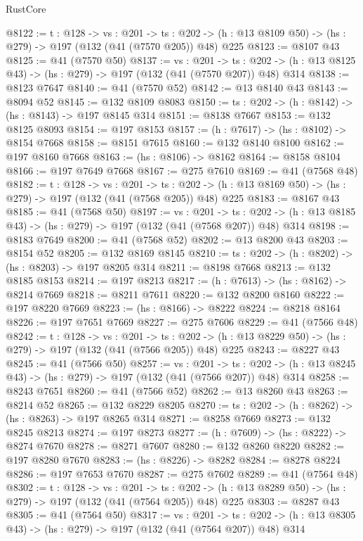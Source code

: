 \begin{lexlean}{RustCore}
\begin{coremodule}
@8122 := {t : @128} ->
  {vs : @201} ->
  {ts : @202} -> (h : @13 @8109 @50) -> (hs : @279) -> @197 (@132 (@41 (@7570 @205)) @48) @225
@8123 := @8107 @43
@8125 := @41 (@7570 @50)
@8137 := {vs : @201} ->
  {ts : @202} -> (h : @13 @8125 @43) -> (hs : @279) -> @197 (@132 (@41 (@7570 @207)) @48) @314
@8138 := @8123 @7647
@8140 := @41 (@7570 @52)
@8142 := @13 @8140 @43
@8143 := @8094 @52
@8145 := @132 @8109 @8083
@8150 := {ts : @202} -> (h : @8142) -> (hs : @8143) -> @197 @8145 @314
@8151 := @8138 @7667
@8153 := @132 @8125 @8093
@8154 := @197 @8153
@8157 := (h : @7617) -> (hs : @8102) -> @8154 @7668
@8158 := @8151 @7615
@8160 := @132 @8140 @8100
@8162 := @197 @8160 @7668
@8163 := (hs : @8106) -> @8162
@8164 := @8158 @8104
@8166 := @197 @7649 @7668
@8167 := @275 @7610
@8169 := @41 (@7568 @48)
@8182 := {t : @128} ->
  {vs : @201} ->
  {ts : @202} -> (h : @13 @8169 @50) -> (hs : @279) -> @197 (@132 (@41 (@7568 @205)) @48) @225
@8183 := @8167 @43
@8185 := @41 (@7568 @50)
@8197 := {vs : @201} ->
  {ts : @202} -> (h : @13 @8185 @43) -> (hs : @279) -> @197 (@132 (@41 (@7568 @207)) @48) @314
@8198 := @8183 @7649
@8200 := @41 (@7568 @52)
@8202 := @13 @8200 @43
@8203 := @8154 @52
@8205 := @132 @8169 @8145
@8210 := {ts : @202} -> (h : @8202) -> (hs : @8203) -> @197 @8205 @314
@8211 := @8198 @7668
@8213 := @132 @8185 @8153
@8214 := @197 @8213
@8217 := (h : @7613) -> (hs : @8162) -> @8214 @7669
@8218 := @8211 @7611
@8220 := @132 @8200 @8160
@8222 := @197 @8220 @7669
@8223 := (hs : @8166) -> @8222
@8224 := @8218 @8164
@8226 := @197 @7651 @7669
@8227 := @275 @7606
@8229 := @41 (@7566 @48)
@8242 := {t : @128} ->
  {vs : @201} ->
  {ts : @202} -> (h : @13 @8229 @50) -> (hs : @279) -> @197 (@132 (@41 (@7566 @205)) @48) @225
@8243 := @8227 @43
@8245 := @41 (@7566 @50)
@8257 := {vs : @201} ->
  {ts : @202} -> (h : @13 @8245 @43) -> (hs : @279) -> @197 (@132 (@41 (@7566 @207)) @48) @314
@8258 := @8243 @7651
@8260 := @41 (@7566 @52)
@8262 := @13 @8260 @43
@8263 := @8214 @52
@8265 := @132 @8229 @8205
@8270 := {ts : @202} -> (h : @8262) -> (hs : @8263) -> @197 @8265 @314
@8271 := @8258 @7669
@8273 := @132 @8245 @8213
@8274 := @197 @8273
@8277 := (h : @7609) -> (hs : @8222) -> @8274 @7670
@8278 := @8271 @7607
@8280 := @132 @8260 @8220
@8282 := @197 @8280 @7670
@8283 := (hs : @8226) -> @8282
@8284 := @8278 @8224
@8286 := @197 @7653 @7670
@8287 := @275 @7602
@8289 := @41 (@7564 @48)
@8302 := {t : @128} ->
  {vs : @201} ->
  {ts : @202} -> (h : @13 @8289 @50) -> (hs : @279) -> @197 (@132 (@41 (@7564 @205)) @48) @225
@8303 := @8287 @43
@8305 := @41 (@7564 @50)
@8317 := {vs : @201} ->
  {ts : @202} -> (h : @13 @8305 @43) -> (hs : @279) -> @197 (@132 (@41 (@7564 @207)) @48) @314

\end{coremodule}
\end{lexlean}
